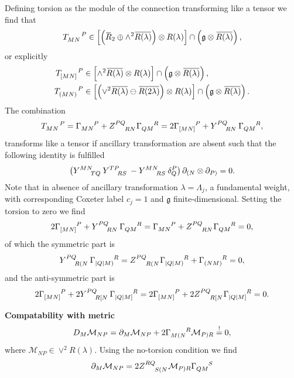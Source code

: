 \documentclass{article}
\begin{document}
Defining torsion as the module of the connection transforming like a tensor we find that 
\begin{equation}
    \tensor{T}{_M_N^P}\in \left[\left(\overbar{R}_2\oplus \wedge^2\overbar{R(\lambda)}\right)\otimes R(\lambda)\right]\cap \left(\mathfrak{g}\otimes\overbar{R(\lambda)}\right),
\end{equation}
or explicitly 
\begin{align}
    \tensor{T}{_{[MN]}^P} &\in \left[\wedge^2\overbar{R(\lambda)}\otimes R(\lambda)\right]\cap \left(\mathfrak{g}\otimes\overbar{R(\lambda)}\right),\\
    \tensor{T}{_{(MN)}^P} &\in \left[\left(\vee^2\overbar{R(\lambda)}\ominus \overbar{R(2\lambda)}\right)\otimes R(\lambda)\right]\cap \left(\mathfrak{g}\otimes\overbar{R(\lambda)}\right).
\end{align}
The combination 
\begin{equation}
    \tensor{T}{_M_N^P} = \tensor{\Gamma}{_M_N^P}+\tensor{Z}{^P^Q_R_N}\tensor{\Gamma}{_Q_M^R} = 2\tensor{\Gamma}{_{[MN]}^P}+\tensor{Y}{^P^Q_R_N}\tensor{\Gamma}{_Q_M^R},
\end{equation}
transforms like a tensor if ancillary transformation are absent such that the following identity is fulfilled 
\begin{equation}
    \left(\tensor{Y}{^M^N_T_Q}\tensor{Y}{^T^P_R_S}-\tensor{Y}{^M^N_R_S}\delta^P_Q\right)\pd_{(N}\otimes\pd_{P)} = 0.
\end{equation}
Note that in absence of ancillary transformation $\lambda=\Lambda_j$, a fundamental weight, with corresponding Coxeter label $c_j=1$ and $\mathfrak{g}$ finite-dimensional.
Setting the torsion to zero we find 
\begin{equation}
    2\tensor{\Gamma}{_{[MN]}^P}+\tensor{Y}{^P^Q_R_N}\tensor{\Gamma}{_Q_M^R} = \tensor{\Gamma}{_{MN}^P}+\tensor{Z}{^P^Q_R_N}\tensor{\Gamma}{_Q_M^R}= 0,
\end{equation}
of which the symmetric part is 
\begin{equation}
    \tensor{Y}{^P^Q_R_{(N}}\tensor{\Gamma}{_{|Q|M)}^R} = \tensor{Z}{^P^Q_R_{(N}}\tensor{\Gamma}{_{|Q|M)}^R}+\tensor{\Gamma}{_{(NM)}^R} = 0,
\end{equation}
and the anti-symmetric part is 
\begin{equation}
    2\tensor{\Gamma}{_{[MN]}^P}+2\tensor{Y}{^P^Q_R_{[N}}\tensor{\Gamma}{_{|Q|M]}^R} = 2\tensor{\Gamma}{_{[MN]}^P}+2\tensor{Z}{^P^Q_R_{[N}}\tensor{\Gamma}{_{|Q|M]}^R} =0.
\end{equation}



\textbf{Compatability with metric}
\begin{equation}
    D_M\mathcal{M}_{NP} = \pd_M\mathcal{M}_{NP}+2\tensor{\Gamma}{_{M(N}^R}\mathcal{M}_{P)R}\overset{!}{=} 0,
\end{equation}
where $\mathcal{M}_{NP}\in \vee^2R(\lambda)$. Using the no-torsion condition we find 
\begin{equation}
    \pd_M\mathcal{M}_{NP} = 2\tensor{Z}{^{RQ}_{S(N}}\mathcal{M}_{P)R}\tensor{\Gamma}{_{QM}^S}
\end{equation}
\end{document}
